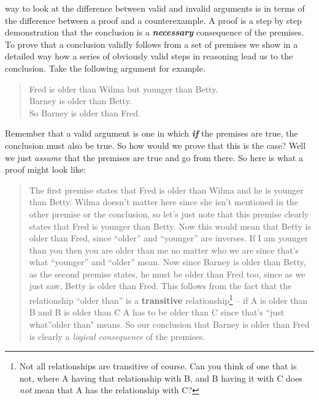 \documentclass[justified]{tufte-book}
\newenvironment{argument}{\begin{quote}\normalsize}{\end{quote}}
\begin{document}
 way to look at the difference between valid and invalid arguments is in terms of the difference between a proof and a counterexample. A proof is a step by step demonstration that the conclusion is a \textbf{\emph{necessary}} consequence of the premises. To prove that a conclusion validly follows from a set of premises we show in a detailed way how a series of obviously valid steps in reasoning lead us to the conclusion. Take the following argument for example.

\begin{argument}
Fred is older than Wilma but younger than Betty.\\
Barney is older than Betty.\\

So Barney is older than Fred.
\end{argument}

Remember that a valid argument is one in which \textbf{\emph{if}} the premises are true, the conclusion must also be true. So how would we prove that this is the case? Well we just \emph{assume} that the premises are true and go from there. So here is what a proof might look like:

\begin{quote}
The first premise states that Fred is older than Wilma and he is younger than Betty. Wilma doesn't matter here since she isn't mentioned in the other premise or the conclusion, so let's just note that this premise clearly states that Fred is younger than Betty. Now this would mean that Betty is older than Fred, since ``older'' and ``younger'' are inverses. If I am younger than you then you are older than me no matter who we are since that's what ``younger'' and ``older'' mean. Now since Barney is older than Betty, as the second premise states, he must be older than Fred too, since as we just saw, Betty is older than Fred. This follows from the fact that the relationship ``older than'' is a \textbf{transitive} relationship\footnote{Not all relationships are transitive of course. Can you think of one that is not, where A having that relationship with B, and B having it with C does \emph{not} mean that A has the relationship with C?} -- if A is older than B and B is older than C A has to be older than C since that's ``just what''older than" means. So our conclusion that Barney is older than Fred is clearly a \emph{logical consequence} of the premises.
\end{quote}
\end{document}
